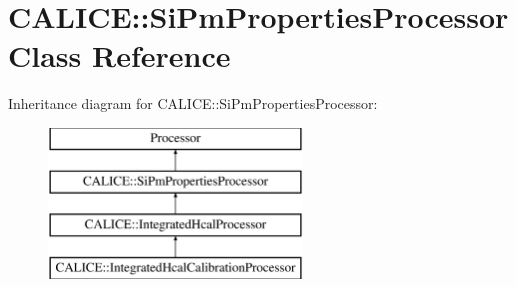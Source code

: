 \section{C\-A\-L\-I\-C\-E\-:\-:Si\-Pm\-Properties\-Processor Class Reference}
\label{classCALICE_1_1SiPmPropertiesProcessor}
Inheritance diagram for C\-A\-L\-I\-C\-E\-:\-:Si\-Pm\-Properties\-Processor\-:\begin{figure}[H]
\begin{center}
\leavevmode
\includegraphics[height=4.000000cm]{classCALICE_1_1SiPmPropertiesProcessor}
\end{center}
\end{figure}
